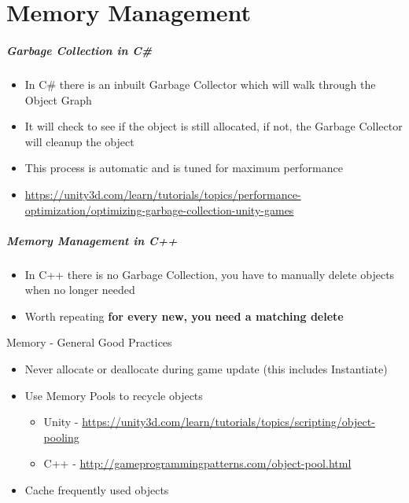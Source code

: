 \part{Memory Management}
\frame{\partpage}

\begin{frame}
\frametitle{Garbage Collection in C\#}
	\begin{itemize}
		\pause \item In C\# there is an inbuilt Garbage Collector which will  walk through the Object Graph
		\pause \item It will check to see if the object is still allocated, if not, the Garbage Collector will cleanup the object
		\pause \item This process is automatic and is tuned for maximum performance
		\pause \item \url{https://unity3d.com/learn/tutorials/topics/performance-optimization/optimizing-garbage-collection-unity-games}
	\end{itemize}
\end{frame}

\begin{frame}
\frametitle{Memory Management in C++}
	\begin{itemize}
		\pause \item In C++ there is no Garbage Collection, you have to manually delete objects when no longer needed
		\pause \item Worth repeating  \textbf{for every new, you need a matching delete}
	\end{itemize}
\end{frame}

\begin{frame}{Memory - General Good Practices}
	\begin{itemize}
		\pause \item Never allocate or deallocate during game update (this includes Instantiate)
		\pause \item Use Memory Pools to recycle objects
		\begin{itemize}
			\pause \item Unity - \url{https://unity3d.com/learn/tutorials/topics/scripting/object-pooling}
			\pause \item C++ - \url{http://gameprogrammingpatterns.com/object-pool.html} 
		\end{itemize}  
		\pause \item Cache frequently used objects
	\end{itemize}
\end{frame}
